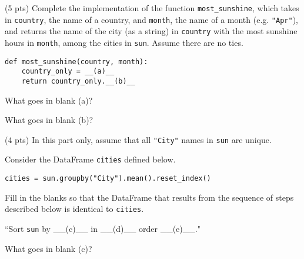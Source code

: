\begin{prob}[(17 pts)]

\begin{subprobset}

\begin{subprob}(5 pts) Complete the implementation of the function \texttt{most\_sunshine}, which takes in \texttt{country}, the name of a country, and \texttt{month}, the name of a month (e.g. \texttt{"Apr"}), and returns the name of the city (as a string) in \texttt{country} with the most sunshine hours in \texttt{month}, among the cities in \texttt{sun}. Assume there are no ties.

\begin{verbatim}
def most_sunshine(country, month):
    country_only = __(a)__
    return country_only.__(b)__
\end{verbatim}

What goes in blank (a)?

\begin{responsebox}{0.5in}
    
\end{responsebox}

What goes in blank (b)?

\begin{responsebox}{1in}
    
\end{responsebox}
    
\end{subprob}

\begin{subprob}(4 pts) In this part only, assume that all \texttt{"City"} names in \texttt{sun} are unique.

Consider the DataFrame \texttt{cities} defined below.

\begin{verbatim}
cities = sun.groupby("City").mean().reset_index()
\end{verbatim}

Fill in the blanks so that the DataFrame that results from the sequence of steps described below is identical to \texttt{cities}.

\begin{center}
``Sort \texttt{sun} by \_\_(c)\_\_ in \_\_(d)\_\_ order \_\_(e)\_\_."
\end{center}

What goes in blank (c)?



\end{subprob}
\end{subprobset}
\end{prob}
